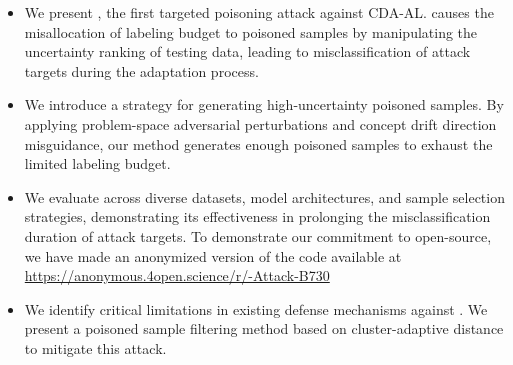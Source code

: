 \begin{itemize}
	\item We present \pandora, the first targeted poisoning attack against CDA-AL.
	\pandora causes the misallocation of labeling budget to poisoned samples by manipulating the uncertainty ranking of testing data, leading to misclassification of attack targets during the adaptation process.
	
	\item We introduce a strategy for generating high-uncertainty poisoned samples.
	By applying problem-space adversarial perturbations and concept drift direction misguidance, our method generates enough poisoned samples to exhaust the limited labeling budget.
	
	\item We evaluate \pandora across diverse datasets, model architectures, and sample selection strategies, demonstrating its effectiveness in prolonging the misclassification duration of attack targets.
	To demonstrate our commitment to open-source, we have made an anonymized version of the code available at \href{https://anonymous.4open.science/r/\pandora-Attack-B730}{https://anonymous.4open.science/r/\pandora-Attack-B730} 
	
	\item We identify critical limitations in existing defense mechanisms against \pandora.
	We present a poisoned sample filtering method based on cluster-adaptive distance to mitigate this attack.
\end{itemize}

